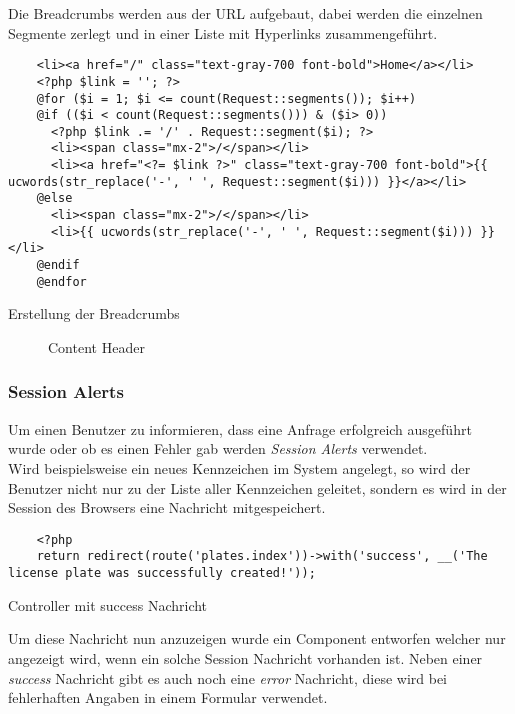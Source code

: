 Die Breadcrumbs werden aus der URL aufgebaut, dabei werden die einzelnen
Segmente zerlegt und in einer Liste mit Hyperlinks zusammengeführt.  

\begin{listing}[H]
  \begin{verbatim}
    <li><a href="/" class="text-gray-700 font-bold">Home</a></li>
    <?php $link = ''; ?>
    @for ($i = 1; $i <= count(Request::segments()); $i++)
    @if (($i < count(Request::segments())) & ($i> 0))
      <?php $link .= '/' . Request::segment($i); ?>
      <li><span class="mx-2">/</span></li>
      <li><a href="<?= $link ?>" class="text-gray-700 font-bold">{{ ucwords(str_replace('-', ' ', Request::segment($i))) }}</a></li>
    @else 
      <li><span class="mx-2">/</span></li>
      <li>{{ ucwords(str_replace('-', ' ', Request::segment($i))) }}</li>
    @endif
    @endfor
  \end{verbatim}
  \caption{Erstellung der Breadcrumbs}
\end{listing}

\begin{figure}[H]
  \centering
  \caption{Content Header}
\end{figure}

\subsubsection{Session Alerts}
Um einen Benutzer zu informieren, dass eine Anfrage erfolgreich ausgeführt wurde
oder ob es einen Fehler gab werden \textit{Session Alerts} verwendet.\\

Wird beispielsweise ein neues Kennzeichen im System angelegt, so wird der
Benutzer nicht nur zu der Liste aller Kennzeichen geleitet, sondern es wird in
der Session des Browsers eine Nachricht mitgespeichert.

\begin{listing}[H]
  \begin{verbatim}
    <?php
    return redirect(route('plates.index'))->with('success', __('The license plate was successfully created!'));
  \end{verbatim}
  \caption{Controller mit success Nachricht}
\end{listing}

Um diese Nachricht nun anzuzeigen wurde ein Component entworfen welcher nur
angezeigt wird, wenn ein solche Session Nachricht vorhanden ist. Neben einer
\textit{success} Nachricht gibt es auch noch eine \textit{error} Nachricht,
diese wird bei fehlerhaften Angaben in einem Formular verwendet.

